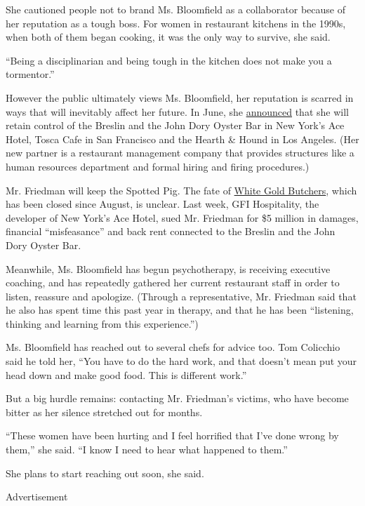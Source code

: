 She cautioned people not to brand Ms. Bloomfield as a collaborator
because of her reputation as a tough boss. For women in restaurant
kitchens in the 1990s, when both of them began cooking, it was the only
way to survive, she said.

``Being a disciplinarian and being tough in the kitchen does not make
you a tormentor.''

However the public ultimately views Ms. Bloomfield, her reputation is
scarred in ways that will inevitably affect her future. In June, she
\href{https://www.nytimes.com/2018/06/06/dining/april-bloomfield-ken-friedman-split.html}{announced}
that she will retain control of the Breslin and the John Dory Oyster Bar
in New York's Ace Hotel, Tosca Cafe in San Francisco and the Hearth \&
Hound in Los Angeles. (Her new partner is a restaurant management
company that provides structures like a human resources department and
formal hiring and firing procedures.)

Mr. Friedman will keep the Spotted Pig. The fate of
\href{https://www.nytimes.com/2017/02/07/dining/white-gold-butchers-review-april-bloomfield-restaurant.html}{White
Gold Butchers}, which has been closed since August, is unclear. Last
week, GFI Hospitality, the developer of New York's Ace Hotel, sued Mr.
Friedman for \$5 million in damages, financial ``misfeasance'' and back
rent connected to the Breslin and the John Dory Oyster Bar.

Meanwhile, Ms. Bloomfield has begun psychotherapy, is receiving
executive coaching, and has repeatedly gathered her current restaurant
staff in order to listen, reassure and apologize. (Through a
representative, Mr. Friedman said that he also has spent time this past
year in therapy, and that he has been ``listening, thinking and learning
from this experience.'')

Ms. Bloomfield has reached out to several chefs for advice too. Tom
Colicchio said he told her, ``You have to do the hard work, and that
doesn't mean put your head down and make good food. This is different
work.''

But a big hurdle remains: contacting Mr. Friedman's victims, who have
become bitter as her silence stretched out for months.

``These women have been hurting and I feel horrified that I've done
wrong by them,'' she said. ``I know I need to hear what happened to
them.''

She plans to start reaching out soon, she said.

Advertisement

